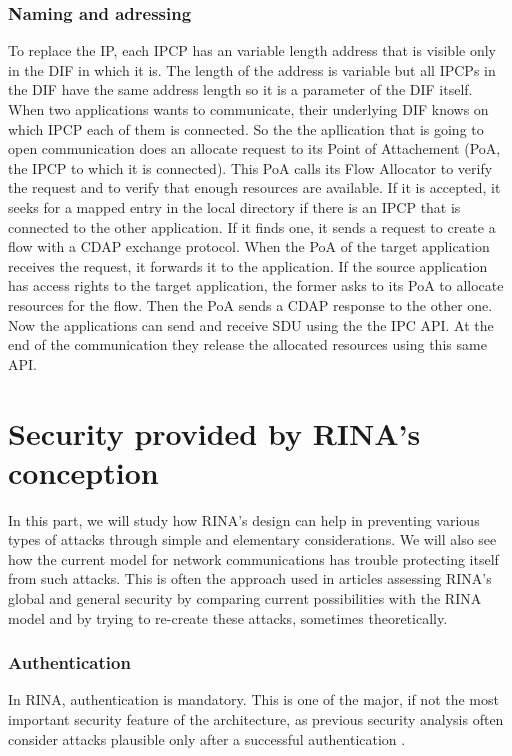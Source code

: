\documentclass[a4paper]{proc}
\begin{document}
\section{Naming and adressing}
To replace the IP, each IPCP has an variable length address that is visible only in the DIF in which it is.
The length of the address is variable but all IPCPs in the DIF have the same address length so it is a parameter of the DIF itself.
When two applications wants to communicate, their underlying DIF knows on which IPCP each of them is connected.
So the the apllication that is going to open communication does an allocate request to its Point of Attachement (PoA, the IPCP to which it is connected).
This PoA calls its Flow Allocator to verify the request and to verify that enough resources are available.
If it is accepted, it seeks for a mapped entry in the local directory if there is an IPCP that is connected to the other application.
If it finds one, it sends a request to create a flow with a CDAP exchange protocol.
When the PoA of the target application receives the request, it forwards it to the application.
If the source application has access rights to the target application, the former asks to its PoA to allocate resources for the flow.
Then the PoA sends a CDAP response to the other one.
Now the applications can send and receive SDU using the the IPC API\@.
At the end of the communication they release the allocated resources using this same API\@.\cite{Trouva2011ISTI}


\part{Security provided by RINA's conception}

\par In this part, we will study how RINA's design can help in preventing
various types of attacks through simple and elementary considerations. We will
also see how the current model for network communications has trouble protecting
itself from such attacks. This is often the approach used in articles assessing
RINA's global and general security by comparing current possibilities with the
RINA model and by trying to re-create these attacks, sometimes theoretically.

\section{Authentication}

\par In RINA, authentication is mandatory. This is one of the major, if not the
most important security feature of the architecture, as previous security
analysis often consider attacks plausible only after a successful authentication
\cite{assessing-security, wiki, PINS}.
\end{document}
